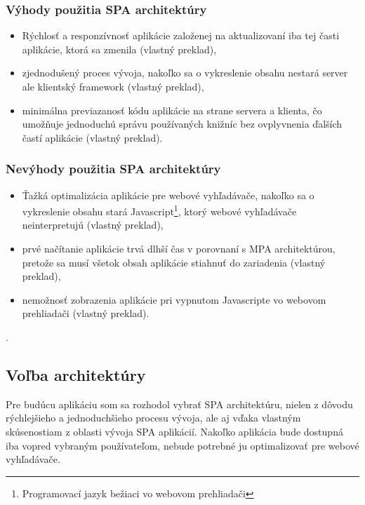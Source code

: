 \subsubsection*{Výhody použitia SPA architektúry}

\begin{itemize}
	\item Rýchlosť a responzívnosť aplikácie založenej na aktualizovaní iba tej časti aplikácie, ktorá sa zmenila \cite{spa-vs-mpa-1} (vlastný preklad),
	\item zjednodušený proces vývoja, nakoľko sa o vykreslenie obsahu nestará server ale klientský framework \cite{spa-vs-mpa-3} (vlastný preklad),
	\item minimálna previazanosť kódu aplikácie na strane servera a klienta, čo umožňuje jednoduchú správu používaných knižníc bez ovplyvnenia ďalších častí aplikácie \cite{spa-vs-mpa-2} (vlastný preklad).
\end{itemize}


\subsubsection*{Nevýhody použitia SPA architektúry}

\begin{itemize}
	\item Ťažká optimalizácia aplikácie pre webové vyhľadávače, nakoľko sa o vykreslenie obsahu stará Javascript\footnote{Programovací jazyk bežiaci vo webovom prehliadači}, ktorý webové vyhľadávače neinterpretujú \cite{spa-vs-mpa-1} (vlastný preklad),
	\item prvé načítanie aplikácie trvá dlhší čas v porovnaní s MPA architektúrou, pretože sa musí všetok obsah aplikácie stiahnuť do zariadenia \cite{spa-vs-mpa-1} (vlastný preklad),
	\item nemožnosť zobrazenia aplikácie pri vypnutom Javascripte vo webovom prehliadači \cite{spa-vs-mpa-2} (vlastný preklad).
\end{itemize}.


\subsection{Voľba architektúry}

Pre budúcu aplikáciu som sa rozhodol vybrať SPA architektúru, nielen z dôvodu rýchlejšieho a jednoduchšieho procesu vývoja, ale aj vďaka vlastným skúsenostiam z oblasti vývoja SPA aplikácií. Nakoľko aplikácia bude dostupná iba vopred vybraným používateľom, nebude potrebné ju optimalizovať pre webové vyhľadávače.

